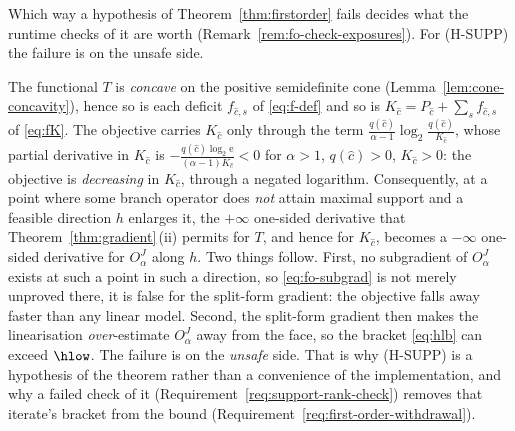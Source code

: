 
Which way a hypothesis of Theorem~\ref{thm:firstorder} fails decides what
the runtime checks of it are worth (Remark~\ref{rem:fo-check-exposures}). For
(H-SUPP) the failure is on the unsafe side.

\begin{remark}\label{rem:fo-danger}
The functional $T$ is \emph{concave} on the positive semidefinite cone
(Lemma~\ref{lem:cone-concavity}), hence so is each deficit
$f_{\hat c,s}$ of \eqref{eq:f-def} and so is
$K_{\hat c}=P_{\hat c}+\sum_sf_{\hat c,s}$ of \eqref{eq:fK}. The objective
carries $K_{\hat c}$ only through the term
$\frac{q(\hat c)}{\alpha-1}\log_2\frac{q(\hat c)}{K_{\hat c}}$, whose
partial derivative in $K_{\hat c}$ is
$-\frac{q(\hat c)\log_2\mathrm e}{(\alpha-1)K_{\hat c}}<0$ for
$\alpha>1$, $q(\hat c)>0$, $K_{\hat c}>0$: the objective is
\emph{decreasing} in $K_{\hat c}$, through a negated logarithm.
Consequently, at a point where some branch operator does \emph{not} attain
maximal support and a feasible direction $h$ enlarges it, the
$+\infty$ one-sided derivative that
Theorem~\ref{thm:gradient}\,(ii) permits for $T$, and hence for
$K_{\hat c}$, becomes a $-\infty$ one-sided derivative for
$O^{J}_{\alpha}$ along $h$. Two things follow. First, no subgradient of
$O^{J}_{\alpha}$ exists at such a point in such a direction, so
\eqref{eq:fo-subgrad} is not merely unproved there, it is false for the
split-form gradient: the objective falls away faster than any linear
model. Second, the split-form gradient then makes the linearisation
\emph{over}-estimate $O^{J}_{\alpha}$ away from the face, so the bracket
\eqref{eq:hlb} can exceed $\hlow$. The failure is on the \emph{unsafe}
side. That is why (H-SUPP) is a hypothesis of the theorem rather than a
convenience of the implementation, and why a failed check of it
(Requirement~\ref{req:support-rank-check}) removes that iterate's bracket
from the bound (Requirement~\ref{req:first-order-withdrawal}).
\end{remark}
